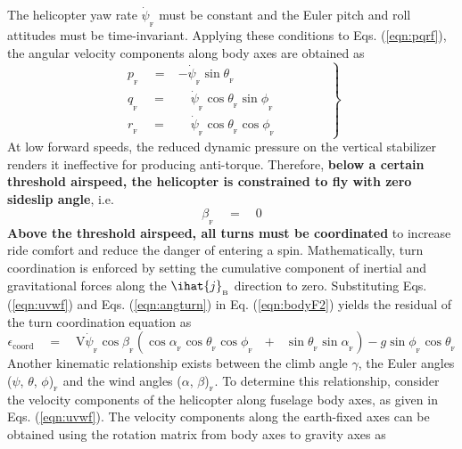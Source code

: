 \begin{itemize}
The helicopter yaw rate $\dot{\psi}_{_\textrm{F}}$ must be constant and the Euler pitch and roll attitudes must be time-invariant. Applying these conditions to Eqs. (\ref{eqn:pqrf}), the angular velocity components along body axes are obtained as  
\begin{equation}
\label{eqn:angturn}
\left.
\begin{aligned}
p_{_\textrm{F}} \quad = & -\dot{\psi}_{_\textrm{F}} \sin \theta_{_\textrm{F}} \qquad \\
q_{_\textrm{F}} \quad = &\quad \dot{\psi}_{_\textrm{F}} \cos \theta_{_\textrm{F}} \sin \phi_{_\textrm{F}} \qquad  \\
r_{_\textrm{F}} \quad = &\quad \dot{\psi}_{_\textrm{F}} \cos \theta_{_\textrm{F}} \cos \phi_{_\textrm{F}} \quad \qquad \quad 
\end{aligned}
\right\}
\end{equation}
At low forward speeds, the reduced dynamic pressure on the vertical stabilizer renders it ineffective for producing anti-torque. Therefore, \textbf{below a certain threshold airspeed, the helicopter is constrained to fly with zero sideslip angle}, i.e. 
\[ \beta_{_\textrm{F}} \quad = \quad 0 \]
\textbf{Above the threshold airspeed, all turns must be coordinated} to increase ride comfort and reduce the danger of entering a spin. Mathematically, turn coordination is enforced by setting the cumulative component of inertial and gravitational forces along the $\ihat{j}_{_\textrm{B}}$ direction to zero. Substituting Eqs. (\ref{eqn:uvwf}) and Eqs. (\ref{eqn:angturn}) in Eq. (\ref{eqn:bodyF2}) yields the residual of the turn coordination equation as 
\begin{equation}
\label{eqn:turncoord}
\epsilon_\textrm{coord} \quad = \quad \textrm{V} \dot{\psi}_{_\textrm{F}} \cos \beta_{_\textrm{F}} (\cos \alpha_{_\textrm{F}} \cos \theta_{_\textrm{F}} \cos \phi_{_\textrm{F}} \textrm{ }+\textrm{ } \sin \theta_{_\textrm{F}} \sin \alpha_{_\textrm{F}}) - g \sin \phi_{_\textrm{F}} \cos \theta_{_\textrm{F}}
\end{equation}
Another kinematic relationship exists between the climb angle $\gamma$, the Euler angles ($\psi$, $\theta$, $\phi$)$_{_\textrm{F}}$  and the wind angles ($\alpha$, $\beta$)$_{_\textrm{F}}$. To determine this relationship, consider the velocity components of the helicopter along fuselage body axes, as given in Eqs. (\ref{eqn:uvwf}). The velocity components along the earth-fixed axes can be obtained using the rotation matrix from body axes to gravity axes as 
\begin{equation}

\end{equation}
\end{itemize}
